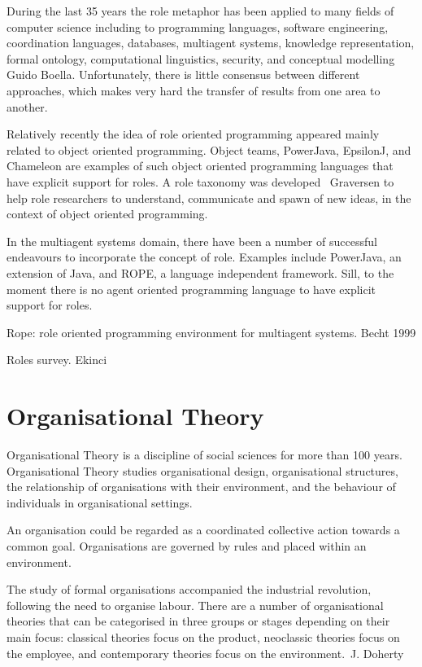\documentclass[a4paper,12pt,oneside,fleqn]{book} %
\theoremstyle{plain}
\theoremstyle{definition}
\theoremstyle{remark}
\begin{document}
During the last 35 years the role metaphor has been applied to many fields
of computer science including to programming languages, software
engineering, coordination languages, databases, multiagent systems,
knowledge representation, formal ontology, computational linguistics,
security, and conceptual modelling~\cite{} Guido Boella. Unfortunately,
there is little consensus between different approaches, which makes very
hard the transfer of results from one area to another.

Relatively recently the idea of role oriented programming appeared mainly
related to object oriented programming. Object teams, PowerJava, EpsilonJ,
and Chameleon are examples of such object oriented programming languages that
have explicit support for roles. A role taxonomy was developed~\cite{}
Graversen to help role researchers to understand, communicate and spawn of
new ideas, in the context of object oriented programming.

In the multiagent systems domain, there have been a number of successful
endeavours to incorporate the concept of role. Examples include PowerJava,
an extension of Java, and ROPE, a language independent framework. Sill,
to the moment there is no agent oriented programming language to have
explicit support for roles.

Rope: role oriented programming environment for multiagent systems. Becht
1999

Roles survey. Ekinci
\section{Organisational Theory}  %

Organisational Theory is a discipline of social sciences for more than 100
years. Organisational Theory studies organisational design, organisational
structures, the relationship of organisations with their environment, and
the behaviour of individuals in organisational settings. 

An organisation could be regarded as a coordinated collective action
towards a common goal. Organisations are governed by rules and placed
within an environment. 

The study of formal organisations accompanied the industrial
revolution, following the need to organise labour. There are a number of
organisational theories that can be categorised in three groups or stages
depending on their main focus: classical theories focus on the product,
neoclassic theories focus on the employee, and contemporary theories focus
on the environment.~\cite{}J. Doherty
\end{document}
